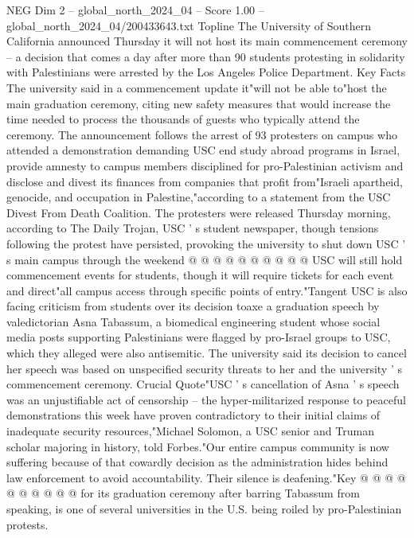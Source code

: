 \begin{textsample}{NEG Dim 2 – global\_north\_2024\_04 – Score 1.00 – global\_north\_2024\_04/200433643.txt}  \label{ex:f2_neg_278}
Topline The University of Southern California announced Thursday it will not host its main commencement ceremony -- a decision that comes a day after more than 90 students protesting in solidarity with Palestinians were arrested by the Los Angeles Police Department.
Key Facts The university said in a commencement update it"will not be able to"host the main graduation ceremony, citing new safety measures that would increase the time needed to process the thousands of guests who typically attend the ceremony.
The announcement follows the arrest of 93 protesters on campus who attended a demonstration demanding USC end study abroad programs in Israel, provide amnesty to campus members disciplined for pro-Palestinian activism and disclose and divest its finances from companies that profit from"Israeli apartheid, genocide, and occupation in Palestine,"according to a statement from the USC Divest From Death Coalition.
The protesters were released Thursday morning, according to The Daily Trojan, USC ' s student newspaper, though tensions following the protest have persisted, provoking the university to shut down USC ' s main campus through the weekend @ @ @ @ @ @ @ @ @ @ USC will still hold commencement events for students, though it will require tickets for each event and direct"all campus access through specific points of entry."Tangent USC is also facing criticism from students over its decision toaxe a graduation speech by valedictorian Asna Tabassum, a biomedical engineering student whose social media posts supporting Palestinians were flagged by pro-Israel groups to USC, which they alleged were also antisemitic.
The university said its decision to cancel her speech was based on unspecified security threats to her and the university ' s commencement ceremony.
Crucial Quote"USC ' s cancellation of Asna ' s speech was an unjustifiable act of censorship -- the hyper-militarized response to peaceful demonstrations this week have proven contradictory to their initial claims of inadequate security resources,"Michael Solomon, a USC senior and Truman scholar majoring in history, told Forbes."Our entire campus community is now suffering because of that cowardly decision as the administration hides behind law enforcement to avoid accountability.
Their silence is deafening."Key @ @ @ @ @ @ @ @ @ @ for its graduation ceremony after barring Tabassum from speaking, is one of several universities in the U.S. being roiled by pro-Palestinian protests.

\end{textsample}

